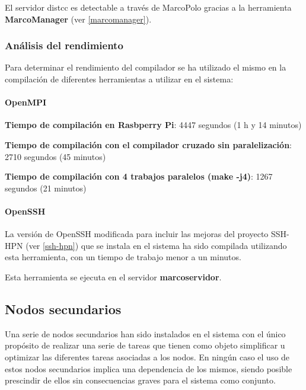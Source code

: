 El servidor distcc es detectable a través de MarcoPolo gracias a la herramienta \textbf{MarcoManager} (ver \ref{marcomanager}).

\subsubsection{Análisis del rendimiento\\}
\label{distcc:performance}

Para determinar el rendimiento del compilador se ha utilizado el mismo en la compilación de diferentes herramientas a utilizar en el sistema:

\paragraph{OpenMPI\\}

\textbf{Tiempo de compilación en Rasbperry Pi}: 4447 segundos (1 h y 14 minutos)

\textbf{Tiempo de compilación con el compilador cruzado sin paralelización}: 2710 segundos (45 minutos)

\textbf{Tiempo de compilación con 4 trabajos paralelos (make -j4)}: 1267 segundos (21 minutos)

\paragraph{OpenSSH\\}

La versión de OpenSSH modificada para incluir las mejoras del proyecto SSH-HPN (ver \ref{ssh-hpn}) que se instala en el sistema ha sido compilada utilizando esta herramienta, con un tiempo de trabajo menor a un minutos.

\vspace{2cm}

Esta herramienta se ejecuta en el servidor \textbf{marcoservidor}.

\subsection{Nodos secundarios}

Una serie de nodos secundarios han sido instalados en el sistema con el único propósito de realizar una serie de tareas que tienen como objeto simplificar u optimizar las diferentes tareas asociadas a los nodos. En ningún caso el uso de estos nodos secundarios implica una dependencia de los mismos, siendo posible prescindir de ellos sin consecuencias graves para el sistema como conjunto.

